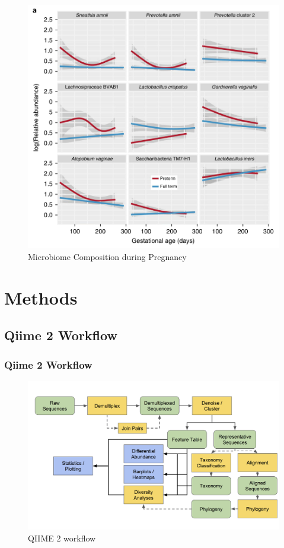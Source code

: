 \documentclass{beamer}
\begin{document}
\begin{frame}[allowframebreaks]
        \begin{figure}
            \includegraphics[width=0.5 \linewidth]{figures/Literature/HMP/gestational.png}
            \caption{Microbiome Composition during Pregnancy}
        \end{figure}
    \end{frame}

    \section{Methods}
    \subsection{Qiime 2 Workflow}
    \begin{frame}
        \frametitle{Qiime 2 Workflow}

        \begin{figure}[h!]
            \includegraphics[width=0.8 \linewidth]{figures/qiime.png}
            \caption{QIIME 2 workflow \protect \cite{qiime1, qiime2, qiime3}}
        \end{figure}
    \end{frame}
\end{document}
